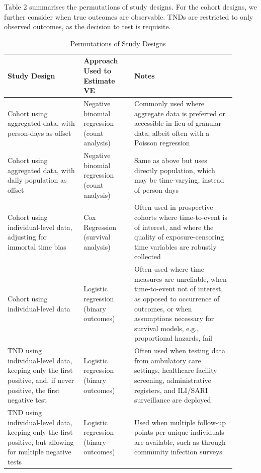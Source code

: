 \documentclass[12pt]{article}
\begin{document}
Table 2 summarises the permutations of study designs. For the cohort designs, we further consider when true outcomes are observable. TNDs are restricted to only observed outcomes, as the decision to test is requisite.

\begin{table}[H]
	\begin{center}
		\caption{Permutations of Study Designs}
		\begin{tabular}{||p{0.3\linewidth}|p{0.2\linewidth}| p{0.4\linewidth}||}
			\hline \hline
			\textbf{Study Design} & \textbf{Approach Used to Estimate VE} & \textbf{Notes} \\
			\hline \hline
			Cohort using aggregated data, with person-days as offset & Negative binomial regression (count analysis) & Commonly used where aggregate data is preferred or accessible in lieu of granular data, albeit often with a Poisson regression \citep{bar2021protection, goldberg2021waning, suah2022waning} \\ 
			\hline
			Cohort using aggregated data, with daily population as offset & Negative binomial regression (count analysis) & Same as above but uses directly population, which may be time-varying, instead of person-days \\ 
			\hline
			Cohort using individual-level data, adjusting for immortal time bias & Cox Regression (survival analysis) & Often used in prospective cohorts where time-to-event is of interest, and where the quality of exposure-censoring time variables are robustly collected \citep{jara2021effectiveness, jaraeffectiveness} \\ 
			\hline
			Cohort using individual-level data & Logistic regression (binary outcomes) & Often used where time measures are unreliable, when time-to-event not of interest, as opposed to occurrence of outcomes, or when assumptions necessary for survival models, e.g., proportional hazards, fail \citep{suah2022waning, suah2021pick} \\ 
			\hline
			TND using individual-level data, keeping only the first positive, and, if never positive, the first negative test & Logistic regression (binary outcomes) & Often used when testing data from ambulatory care settings, healthcare facility screening, administrative registers, and ILI/SARI surveillance are deployed \citep{olson2022effectiveness} \\ 
			\hline 
			TND using individual-level data, keeping only the first positive, but allowing for multiple negative tests & Logistic regression (binary outcomes) & Used when multiple follow-up points per unique individuals are available, such as through community infection surveys \citep{bernal2021effectiveness} \\ 
			\hline
			\hline
		\end{tabular}
	\end{center}
\end{table}	
\end{document}
